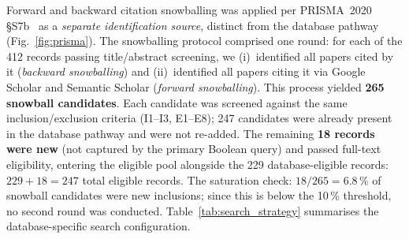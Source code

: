Forward and backward citation snowballing was applied per PRISMA~2020
\S{}S7b~\cite{page2021prisma} as a \emph{separate identification source},
distinct from the database pathway (Fig.~\ref{fig:prisma}).
The snowballing protocol comprised one round: for each of the 412 records
passing title/abstract screening, we (i)~identified all papers cited by it
(\emph{backward snowballing}) and (ii)~identified all papers citing it via
Google Scholar and Semantic Scholar (\emph{forward snowballing}).
This process yielded \textbf{265 snowball candidates}.
Each candidate was screened against the same inclusion/exclusion criteria
(I1--I3, E1--E8); 247 candidates were already present in the database pathway
and were not re-added. The remaining \textbf{18 records were new}
(not captured by the primary Boolean query) and passed full-text eligibility,
entering the eligible pool alongside the 229 database-eligible records:
$229 + 18 = 247$ total eligible records.
The saturation check: $18/265 = 6.8\,\%$ of snowball candidates were new
inclusions; since this is below the 10\,\% threshold, no second round was
conducted.
Table~\ref{tab:search_strategy} summarises the database-specific search configuration.

